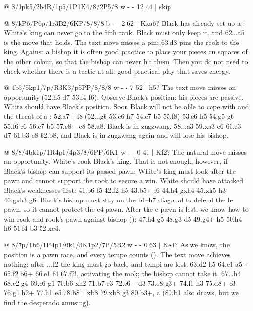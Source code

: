 @ 8/1pk5/2b4R/1p6/1P1K4/8/2P5/8 w - - 12 44 | skip

@ 8/kP6/P6p/1r3B2/6KP/8/8/8 b - - 2 62 | Kxa6?
Black has already set up a : White's king can never go to the fifth
rank. Black must only keep it, and 62...\R a5 is the move that holds. The text move misses a pin:
63.\B d3 pins the rook to the king. Against a bishop it is often good practice to place
your pieces on squares of the other colour, so that the bishop can never hit them. Then you do not
need to check whether there is a tactic at all: good practical play that saves
energy.

@ 4b3/5kp1/7p/R3K3/p5PP/8/8/8 w - - 7 52 | h5?
The text move misses an opportunity (52.h5 \B d7 53.\K f4 \K f6). Observe Black's position: his
pieces are passive. White should have
 Black's position. Soon Black will not be able
to cope with  and the threat of a
: 52.\R a7+ \K f8 (52...\K g6 53.\K e6 \K h7 54.\K e7
\B b5 55.\K f8) 53.\K e6 h5 54.g5 g6 55.\K f6 \B c6 56.\R c7 \B b5 57.\R c8+ \B e8 58.\R a8. Black
is in zugzwang. 58...a3 59.\R xa3 \B c6 60.\R c3 \B d7 61.\R b3 \B e8 62.\R b8, and Black is in
zugzwang again and will lose his bishop.

@ 8/8/4bk1p/1R4p1/4p3/8/6PP/6K1 w - - 0 41 | Kf2?
The natural move misses an opportunity. White's rook 
Black's king. That is not enough, however, if Black's bishop can support its passed pawn: White's
king must look after the pawn and cannot support the rook to secure a win. White should have
attacked Black's weaknesses first: 41.\R b6 \K f5 42.\K f2 h5 43.\R b5+ \K f6 44.h4 gxh4 45.\R xh5 h3
46.gxh3 \K g6. Black's bishop must stay on the b1--h7 diagonal to defend the h-pawn, so it cannot
protect the e4-pawn. After the e-pawn is lost, we know how to win rook and rook's pawn against
bishop (): 47.\R h4 \K g5 48.\K g3 \B d5 49.\R g4+ \K h5 50.h4
\K h6 51.\K f4 \B b3 52.\K xe4.

@ 8/7p/1b6/1P4p1/6k1/3K1p2/7P/5R2 w - - 0 63 | Ke4?
As we know, the position is a pawn race, and every tempo counts
(). The text move achieves nothing:
after ...f2 the king must go back, and tempi are lost. 63.\K d2 h5 64.\K e1 \B a5+ 65.\K f2 \B b6+
66.\K e1 \K f4 67.\R f2!, activating the rook; the bishop cannot take
it. 67...h4 68.\R c2 g4 69.\R c6 \B g1 70.b6 \B xh2 71.b7 \K e3 72.\R e6+ \K d3 73.\R e8 \B g3+
74.\K f1 h3 75.\R d8+ \K c3 76.\K g1 h2+ 77.\K h1 \B e5 78.b8=\Q{} \B xb8 79.\R xb8 g3 80.\R b3+, a
 (80.\R b1 also draws, but we find the desperado amusing).

